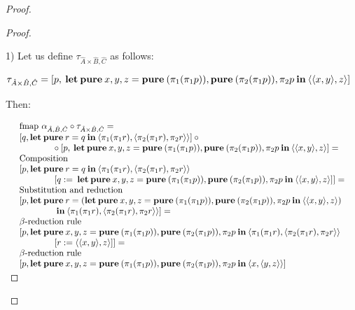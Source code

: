 \documentclass[a4paper]{article}
\begin{document}
\begin{proof}
\begin{proof}
  $ $

1) Let us define $\tau_{\hat{A} \times \hat{B}, \hat{C}}$ as follows:

$\tau_{\hat{A} \times \hat{B}, \hat{C}} = [p, {\bf \: let \: pure \:} x,y,z = {\bf pure\:} (\pi_1 (\pi_1 p)), {\bf pure \:} (\pi_2 (\pi_1 p)), \pi_2 p {\: \bf in \:} \langle \langle x,y \rangle, z \rangle]$

\vspace{\baselineskip}

Then:

\vspace{\baselineskip}

$\begin{array}{lll}
&\text{fmap } \alpha_{\hat{A},\hat{B},\hat{C}} \circ \tau_{\hat{A} \times \hat{B}, \hat{C}} = & \\
&[q, {\bf let \: pure \:} r = q {\: \bf in \:}  \langle \pi_1 (\pi_1 r), \langle \pi_2 (\pi_1 r), \pi_2 r \rangle \rangle] \: \circ & \\
&\quad\quad\quad\quad \circ \: [p, {\bf \: let \: pure \:} x,y,z = {\bf pure\:} (\pi_1 (\pi_1 p)), {\bf pure \:} (\pi_2 (\pi_1 p)), \pi_2 p {\: \bf in \:} \langle \langle x,y \rangle, z \rangle] = & \\
&\text{Composition}& \\
&[p, {\bf let \: pure \:} r = q {\: \bf in \:}  \langle \pi_1 (\pi_1 r), \langle \pi_2 (\pi_1 r), \pi_2 r \rangle \rangle & \\
&\quad\quad\quad\quad [q := {\bf \: let \: pure \:} x,y,z = {\bf pure\:} (\pi_1 (\pi_1 p)), {\bf pure \:} (\pi_2 (\pi_1 p)), \pi_2 p {\: \bf in \:} \langle \langle x,y \rangle, z \rangle]] = & \\
&\text{Substitution and reduction}& \\
&[p, {\bf let \: pure \:} r = ({\bf let \: pure \:} x,y,z = {\bf pure\:} (\pi_1 (\pi_1 p)), {\bf pure \:} (\pi_2 (\pi_1 p)), \pi_2 p {\: \bf in \:} \langle \langle x,y \rangle, z \rangle) & \\
&\quad\quad\quad\quad {\: \bf in \:} \langle \pi_1 (\pi_1 r), \langle \pi_2 (\pi_1 r), \pi_2 r \rangle \rangle] = & \\
&\text{$\beta$-reduction rule}& \\
&[p, {\bf let \: pure \:} x,y,z = {\bf pure\:} (\pi_1 (\pi_1 p)), {\bf pure \:} (\pi_2 (\pi_1 p)), \pi_2 p {\: \bf in \:}  \langle \pi_1 (\pi_1 r), \langle \pi_2 (\pi_1 r), \pi_2 r \rangle \rangle & \\
&\quad\quad\quad\quad [r := \langle \langle x,y \rangle, z \rangle]] = & \\
&\text{$\beta$-reduction rule}& \\
&[p, {\bf let \: pure \:} x,y,z = {\bf pure\:} (\pi_1 (\pi_1 p)), {\bf pure \:} (\pi_2 (\pi_1 p)), \pi_2 p {\: \bf in \:} \langle x, \langle y, z \rangle \rangle]&
\end{array}$


\end{proof}
\end{proof}
\end{document}
